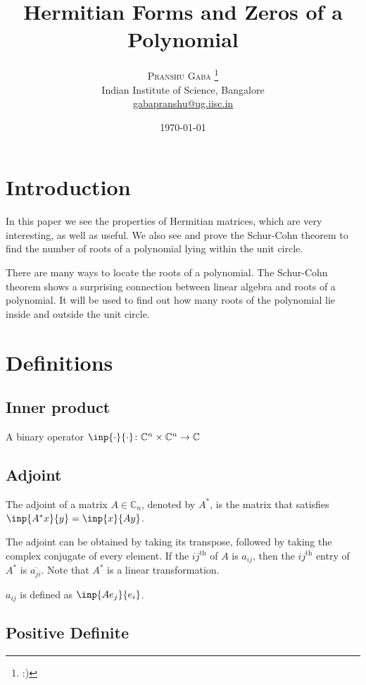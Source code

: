\documentclass[twofold]{article}
\author{%
\textsc{Pranshu Gaba} \thanks{:)} \\[1ex]
\normalsize Indian Institute of Science, Bangalore \\
\normalsize \href{mailto:gabapranshu@iisc.ac.in}{gabapranshu@ug.iisc.in}}
\title{Hermitian Forms and Zeros of a Polynomial}
\date{\today}
\newcommand*\conj[1]{\overline{#1}}
\newcommand*\adj[1]{#1^*}
\theoremstyle{plain}
\theoremstyle{definition}
\begin{document}
\maketitle

\section{Introduction}




In this paper we see the properties of Hermitian matrices, which are very interesting, as well as useful. We also see and prove the Schur-Cohn theorem to find the number of roots of a polynomial lying within the unit circle. 

There are many ways to locate the roots of a polynomial. The Schur-Cohn theorem shows a surprising connection between linear algebra and roots of a polynomial. It will be used to find out how many roots of the polynomial lie inside and outside the unit circle.


\section{Definitions}


\subsection{Inner product}

A binary operator \(\inp{\cdot}{\cdot} \colon \mathbb{C}^n \times \mathbb{C}^n \to \mathbb{C}\)


\subsection{Adjoint}

The adjoint of a matrix \(A \in \mathbb{C}_n\), denoted by \(\adj{A}\), is the matrix that  satisfies \(\inp{\adj{A}x}{y} = \inp{x}{Ay}\). 

The adjoint can be obtained by taking its transpose, followed by taking the complex conjugate of every element. If the \(ij^{\text{th}} \) of \(A\) is \(a_{ij}\), then the \(ij^{\text{th}}\) entry of \(\adj{A}\) is \(\conj{a_{ji}}\). Note that \(\adj{A}\) is a linear transformation.

\(a_{ij}\) is defined as \(\inp{Ae_j}{e_i}\).

\subsection{Positive Definite}
\end{document}
